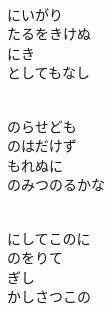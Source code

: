 \documentclass[10pt,b5j]{tarticle} %
\begin{document}
\begin{enumerate}
\begin{minipage}[c]{\blocksize}
        \vspace{\linespace}
        \item~\\
        にいがり\\
        たるをきけぬ\\
        にき\\
        としてもなし
        
        \vspace{\linespace}
        \item~\\
        のらせども\\
        のはだけず\\
        もれぬに\\
        のみつのるかな
        
        \vspace{\linespace}
        \item~\\
        にしてこのに\\
        のをりて\\
        ぎし\\
        かしさつこの
    
    \end{minipage}
\end{enumerate} %
\end{document}
